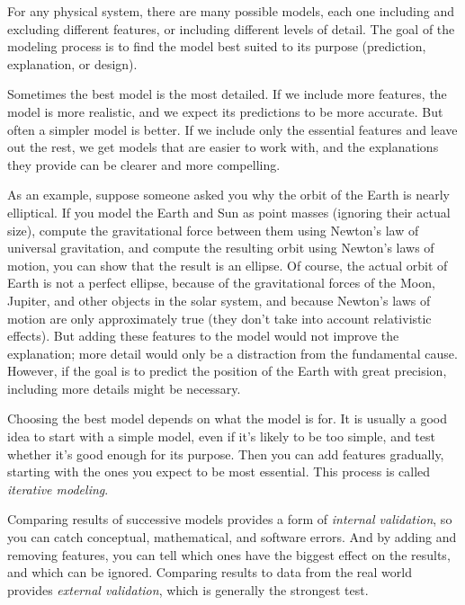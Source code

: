 
For any physical system, there are many possible models, each one including and excluding different features, or including different levels of detail.  The goal of the modeling process is to find the model best suited to its purpose (prediction, explanation, or design).


Sometimes the best model is the most detailed.  If we include more features, the model is more realistic, and we expect its predictions to be more accurate.  
But often a simpler model is better.  If we include only the essential features and leave out the rest, we get models that are easier to work with, and the explanations they provide can be clearer and more compelling. 

As an example, suppose someone asked you why the orbit of the Earth is nearly elliptical.  If you model the Earth and Sun as point masses (ignoring their actual size), compute the gravitational force between them using Newton's law of universal gravitation, and compute the resulting orbit using Newton's laws of motion, you can show that the result is an ellipse.  
Of course, the actual orbit of Earth is not a perfect ellipse, because of the gravitational forces of the Moon, Jupiter, and other objects in the solar system, and because Newton's laws of motion are only approximately true (they don't take into account relativistic effects).
But adding these features to the model would not improve the explanation; more detail would only be a distraction from the fundamental cause.  However, if the goal is to predict the position of the Earth with great precision, including more details might be necessary.  

Choosing the best model depends on what the model is for.  It is usually a good idea to start with a simple model, even if it's likely to be too simple, and test whether it's good enough for its purpose.  Then you can add features gradually, starting with the ones you expect to be most essential.  This process is called \emph{iterative modeling}.


Comparing results of successive models provides a form of \emph{internal validation}, so you can catch conceptual, mathematical, and software errors.  And by adding and removing features, you can tell which ones have the biggest effect on the results, and which can be ignored.
Comparing results to data from the real world provides \emph{external validation}, which is generally the strongest test.

